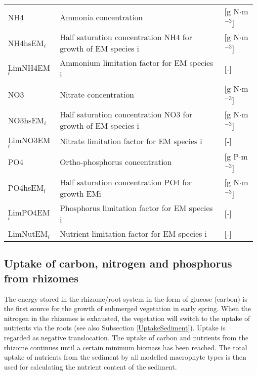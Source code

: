 \begin{tabular}{lll}
NH4               & Ammonia concentration                                           & [g N$\cdot$m$^{-3}$] \\
NH4hsEM$_i$       & Half saturation concentration  NH4 for growth of EM species i   & [g N$\cdot$m$^{-3}$] \\
LimNH4EM$_i$      & Ammonium limitation factor for EM species i                     & [-]                  \\
NO3               & Nitrate concentration                                           & [g N$\cdot$m$^{-3}$] \\
NO3hsEM$_i$       & Half saturation concentration NO3 for growth of EM species i    & [g N$\cdot$m$^{-3}$] \\
LimNO3EM$_i$      & Nitrate limitation factor for EM species i                      & [-]                  \\
PO4               & Ortho-phosphorus concentration                                  & [g P$\cdot$m$^{-3}$] \\
PO4hsEM$_i$       & Half saturation concentration PO4 for growth EMi                & [g N$\cdot$m$^{-3}$] \\
LimPO4EM$_i$      & Phosphorus limitation factor for EM species i                   & [-]                  \\
LimNutEM$_i$      & Nutrient limitation factor for EM species i                     & [-]                  \\
\end{tabular}

\subsection{Uptake of carbon, nitrogen and phosphorus from rhizomes}
The energy stored in the rhizome/root system in the form of glucose (carbon) is the first source for the
growth of submerged vegetation in early spring. When the nitrogen in the rhizomes is exhausted, the vegetation
will switch to the uptake of nutrients via the roots (see also Subsection \ref{UptakeSediment}). Uptake is
regarded as negative translocation. The uptake of carbon and nutrients from the rhizome continues until a
certain minimum biomass has been reached. The total uptake of nutrients from the sediment by all modelled macrophyte
types is then used for calculating the nutrient content of the sediment.

